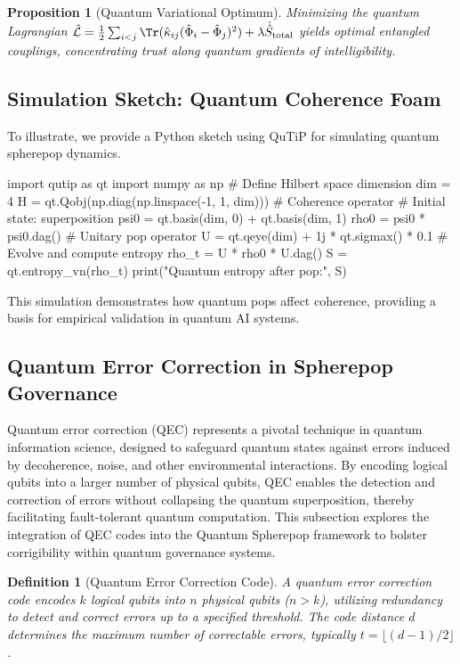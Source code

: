 \documentclass[12pt]{article}
\newtheorem{definition}{Definition}
\newtheorem{proposition}{Proposition}
\begin{document}
\begin{proposition}[Quantum Variational Optimum]
Minimizing the quantum Lagrangian \(\hat{\mathcal{L}} = \frac{1}{2} \sum_{i<j} \Tr(\hat{\kappa}_{ij} (\hat{\Phi}_i - \hat{\Phi}_j)^2) + \lambda \dot{\hat{S}}_{\text{total}}\) yields optimal entangled couplings, concentrating trust along quantum gradients of intelligibility.
\end{proposition}

\subsection{Simulation Sketch: Quantum Coherence Foam}
To illustrate, we provide a Python sketch using QuTiP for simulating quantum spherepop dynamics.

\begin{codeblock}
import qutip as qt
import numpy as np
# Define Hilbert space dimension
dim = 4
H = qt.Qobj(np.diag(np.linspace(-1, 1, dim)))  # Coherence operator
# Initial state: superposition
psi0 = qt.basis(dim, 0) + qt.basis(dim, 1)
rho0 = psi0 * psi0.dag()
# Unitary pop operator
U = qt.qeye(dim) + 1j * qt.sigmax() * 0.1
# Evolve and compute entropy
rho_t = U * rho0 * U.dag()
S = qt.entropy_vn(rho_t)
print("Quantum entropy after pop:", S)
\end{codeblock}

This simulation demonstrates how quantum pops affect coherence, providing a basis for empirical validation in quantum AI systems.

\subsection{Quantum Error Correction in Spherepop Governance}
Quantum error correction (QEC) represents a pivotal technique in quantum information science, designed to safeguard quantum states against errors induced by decoherence, noise, and other environmental interactions. By encoding logical qubits into a larger number of physical qubits, QEC enables the detection and correction of errors without collapsing the quantum superposition, thereby facilitating fault-tolerant quantum computation. This subsection explores the integration of QEC codes into the Quantum Spherepop framework to bolster corrigibility within quantum governance systems.

\begin{definition}[Quantum Error Correction Code]
A quantum error correction code encodes \(k\) logical qubits into \(n\) physical qubits (\(n > k\)), utilizing redundancy to detect and correct errors up to a specified threshold. The code distance \(d\) determines the maximum number of correctable errors, typically \(t = \lfloor (d-1)/2 \rfloor\).
\end{definition}
\end{document}
